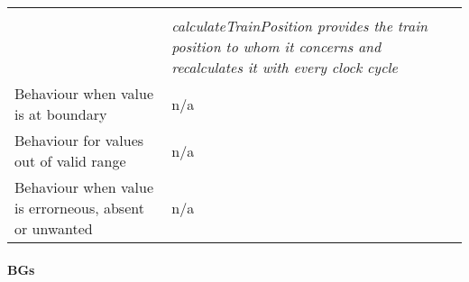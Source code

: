 \begin{longtable}{p{}p{}}
\begin{itemize}
\end{itemize}  \\

                     	&  \emph{calculateTrainPosition provides the train position to whom it concerns and recalculates it with every clock cycle}
\\

\midrule
Behaviour when value is at boundary	& n/a \\
\midrule
Behaviour for values out of valid range	& n/a \\

\midrule
Behaviour when value is errorneous, absent or unwanted & n/a \\

\bottomrule
\end{longtable}


\paragraph{BGs}

